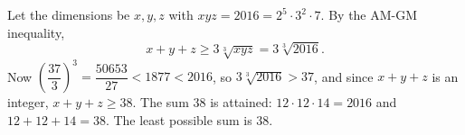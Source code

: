 Let the dimensions be $x,y,z$ with $xyz=2016=2^5\cdot3^2\cdot7$. By the AM-GM inequality,
\[
x+y+z\ge3\sqrt[3]{xyz}=3\sqrt[3]{2016}.
\]
Now $\left(\dfrac{37}{3}\right)^3=\dfrac{50653}{27}<1877<2016$, so $3\sqrt[3]{2016}>37$, and since $x+y+z$ is an integer, $x+y+z\ge38$. The sum $38$ is attained: $12\cdot12\cdot14=2016$ and $12+12+14=38$. The least possible sum is $\boxed{38}$.
